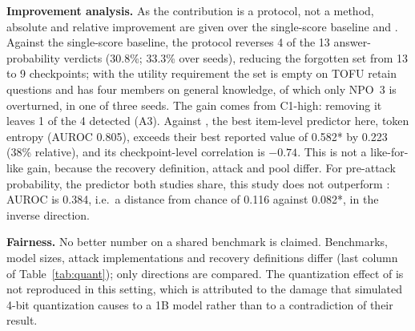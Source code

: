 \documentclass[conference]{IEEEtran}
\begin{document}
\textbf{Improvement analysis.} As the contribution is a protocol, not a method, absolute and relative improvement are given over the single-score baseline and \cite{song2026measure}. Against the single-score baseline, the protocol reverses 4 of the 13 answer-probability verdicts (30.8\%; 33.3\% over seeds), reducing the forgotten set from 13 to 9 checkpoints; with the utility requirement the set is empty on TOFU retain questions and has four members on general knowledge, of which only NPO~3 is overturned, in one of three seeds. The gain comes from C1-high: removing it leaves 1 of the 4 detected (A3). Against \cite{song2026measure}, the best item-level predictor here, token entropy (AUROC 0.805), exceeds their best reported value of 0.582* by 0.223 (38\% relative), and its checkpoint-level correlation is $-0.74$. This is not a like-for-like gain, because the recovery definition, attack and pool differ. For pre-attack probability, the predictor both studies share, this study does not outperform \cite{song2026measure}: AUROC is 0.384, i.e.\ a distance from chance of 0.116 against 0.082*, in the inverse direction.

\textbf{Fairness.} No better number on a shared benchmark is claimed. Benchmarks, model sizes, attack implementations and recovery definitions differ (last column of Table~\ref{tab:quant}); only directions are compared. The quantization effect of \cite{zhang2025quant} is not reproduced in this setting, which is attributed to the damage that simulated 4-bit quantization causes to a 1B model rather than to a contradiction of their result.

\end{document}
